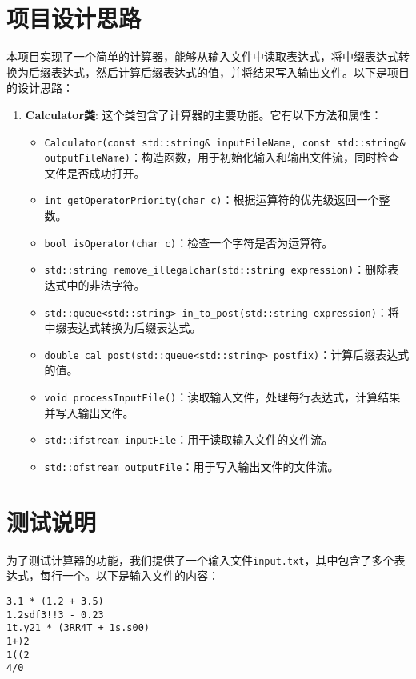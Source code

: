 \documentclass[twoside,a4paper,10pt]{article}
\begin{document}
\pagestyle{fancy}
\fancyhead{}
\rhead{\today}


\section{项目设计思路}
本项目实现了一个简单的计算器，能够从输入文件中读取表达式，将中缀表达式转换为后缀表达式，然后计算后缀表达式的值，并将结果写入输出文件。以下是项目的设计思路：

\begin{enumerate}
\item \textbf{Calculator类}: 这个类包含了计算器的主要功能。它有以下方法和属性：
    \begin{itemize}
    \item \texttt{Calculator(const std::string\& inputFileName, const std::string\& outputFileName)}：构造函数，用于初始化输入和输出文件流，同时检查文件是否成功打开。
    \item \texttt{int getOperatorPriority(char c)}：根据运算符的优先级返回一个整数。
    \item \texttt{bool isOperator(char c)}：检查一个字符是否为运算符。
    \item \texttt{std::string remove\_illegalchar(std::string expression)}：删除表达式中的非法字符。
    \item \texttt{std::queue<std::string> in\_to\_post(std::string expression)}：将中缀表达式转换为后缀表达式。
    \item \texttt{double cal\_post(std::queue<std::string> postfix)}：计算后缀表达式的值。
    \item \texttt{void processInputFile()}：读取输入文件，处理每行表达式，计算结果并写入输出文件。
    \item \texttt{std::ifstream inputFile}：用于读取输入文件的文件流。
    \item \texttt{std::ofstream outputFile}：用于写入输出文件的文件流。
    \end{itemize}
\end{enumerate}

\section{测试说明}
为了测试计算器的功能，我们提供了一个输入文件\texttt{input.txt}，其中包含了多个表达式，每行一个。以下是输入文件的内容：

\begin{lstlisting}
3.1 * (1.2 + 3.5)
1.2sdf3!!3 - 0.23
1t.y21 * (3RR4T + 1s.s00)
1+)2
1((2
4/0
\end{lstlisting}
\end{document}

